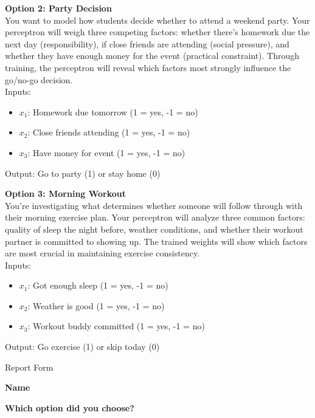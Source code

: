 \vspace{0.4cm}
\noindent\textbf{Option 2: Party Decision}\\
You want to model how students decide whether to attend a weekend party. Your perceptron will weigh three competing factors: whether there's homework due the next day (responsibility), if close friends are attending (social pressure), and whether they have enough money for the event (practical constraint). Through training, the perceptron will reveal which factors most strongly influence the go/no-go decision.\\
Inputs:
\begin{itemize}
\item $x_1$: Homework due tomorrow (1 = yes, -1 = no)
\item $x_2$: Close friends attending (1 = yes, -1 = no)
\item $x_3$: Have money for event (1 = yes, -1 = no)
\end{itemize}
Output: Go to party (1) or stay home (0)

\vspace{0.4cm}
\noindent\textbf{Option 3: Morning Workout}\\
You're investigating what determines whether someone will follow through with their morning exercise plan. Your perceptron will analyze three common factors: quality of sleep the night before, weather conditions, and whether their workout partner is committed to showing up. The trained weights will show which factors are most crucial in maintaining exercise consistency.\\
Inputs:
\begin{itemize}
\item $x_1$: Got enough sleep (1 = yes, -1 = no)
\item $x_2$: Weather is good (1 = yes, -1 = no)
\item $x_3$: Workout buddy committed (1 = yes, -1 = no)
\end{itemize}
Output: Go exercise (1) or skip today (0)

\newpage
\begin{center} \large Report Form \end{center}\par
\noindent\textbf{Name}\\
\noindent \framebox[.9\textwidth][l]{\rule{0pt}{1cm}}

\noindent\textbf{Which option did you choose?}\\
\noindent \framebox[.9\textwidth][l]{\rule{0pt}{1cm}}

